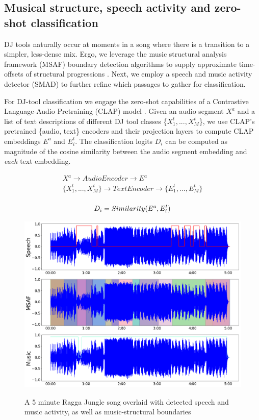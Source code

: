 \documentclass{article}
\begin{document}
\subsection{Musical structure, speech activity and zero-shot classification}\label{sec:djtool_classes}
DJ tools naturally occur at moments in a song where there is a transition to a simpler, less-dense mix. Ergo, we leverage the music structural analysis framework (MSAF) boundary detection algorithms to supply approximate time-offsets of structural progressions \cite{nieto2016systematic}. Next, we employ a speech and music activity detector (SMAD)\cite{Hung2022} to further refine which passages to gather for classification.

For DJ-tool classification we engage the zero-shot capabilities of a Contrastive Language-Audio Pretraining (CLAP) model \cite{elizalde2022claplearningaudioconcepts}. Given an audio segment $X^{a}$ and a list of text descriptions of different DJ tool classes \{$X^{t}_{1},...,X^{t}_{M}$\}, we use CLAP's pretrained \{audio, text\} encoders and their projection layers to compute CLAP embeddings $E^a$ and $E^t_i$. The classification logits $D_i$ can be computed as magnitude of the cosine similarity between the audio segment embedding and \textit{each} text embedding.

\begin{equation}
\begin{matrix}
    X^{a} \rightarrow AudioEncoder \rightarrow E^{a} \\ 
    \{X^{t}_{1},...,X^{t}_{M}\} \rightarrow TextEncoder \rightarrow \{E^{t}_{1},...,E^{t}_{M}\} \\ 
\end{matrix}
\end{equation}

\begin{equation}
    D_i = Similarity(E^a, E^{t}_{i}) \\ 
\end{equation}


\begin{figure}
 \centerline{
 	\includegraphics[alt={SMAD \& MSAF Analysis signals},width=0.9\columnwidth]{smad_msaf.png}}
 \caption{A 5 minute Ragga Jungle song overlaid with detected speech and music activity, as well as music-structural boundaries}
 \label{fig:msafsmadplot}
\end{figure}
\end{document}
